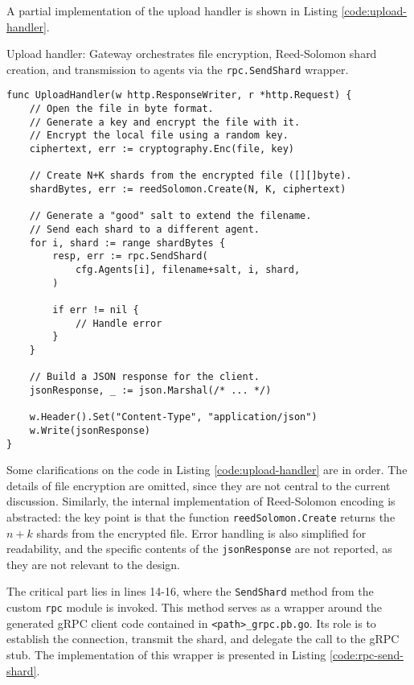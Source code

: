 A partial implementation of the upload handler is shown in Listing \ref{code:upload-handler}.

\begin{listing}
\caption{Upload handler: Gateway orchestrates file encryption, Reed-Solomon shard creation, and transmission to agents via the \texttt{rpc.SendShard} wrapper.}
\label{code:upload-handler}
\begin{verbatim}
func UploadHandler(w http.ResponseWriter, r *http.Request) {
    // Open the file in byte format.
    // Generate a key and encrypt the file with it.
    // Encrypt the local file using a random key.
    ciphertext, err := cryptography.Enc(file, key)
    
    // Create N+K shards from the encrypted file ([][]byte).
    shardBytes, err := reedSolomon.Create(N, K, ciphertext)

    // Generate a "good" salt to extend the filename.
    // Send each shard to a different agent.
    for i, shard := range shardBytes {
        resp, err := rpc.SendShard(
            cfg.Agents[i], filename+salt, i, shard,
        )

        if err != nil {
            // Handle error
        }
    }
    
    // Build a JSON response for the client.
    jsonResponse, _ := json.Marshal(/* ... */)

    w.Header().Set("Content-Type", "application/json")
    w.Write(jsonResponse)
}

\end{verbatim}
\end{listing}

Some clarifications on the code in Listing \ref{code:upload-handler} are in order.
The details of file encryption are omitted, since they are not central to the current discussion. Similarly, the internal implementation of Reed-Solomon encoding is abstracted: the key point is that the function \texttt{reedSolomon.Create} returns the $n+k$ shards from the encrypted file. Error handling is also simplified for readability, and the specific contents of the \texttt{jsonResponse} are not reported, as they are not relevant to the design.

The critical part lies in lines 14-16, where the \texttt{SendShard} method from the custom \texttt{rpc} module is invoked. This method serves as a wrapper around the generated gRPC client code contained in \texttt{<path>\_grpc.pb.go}. Its role is to establish the connection, transmit the shard, and delegate the call to the gRPC stub. The implementation of this wrapper is presented in Listing \ref{code:rpc-send-shard}.

